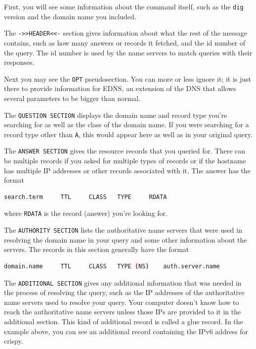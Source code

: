 \documentclass[11pt,a4paper]{article}
\begin{document}
First, you will see some information about the command itself, such as the \verb|dig| version and the domain name you included.

The \verb|->>HEADER<<-| section gives information about what the rest of the message contains, such as how many answers or records it fetched, and the id number of the query. 
The id number is used by the name servers to match queries with their responses. 

Next you may see the \verb|OPT| pseudosection. 
You can more or less ignore it; it is just there to provide information for EDNS, an extension of the DNS that allows several parameters to be bigger than normal. 

The \verb|QUESTION SECTION| displays the domain name and record type you're searching for as well as the class of the domain name. 
If you were searching for a record type other than \verb|A|, this would appear here as well as in your original query.

The \verb|ANSWER SECTION| gives the resource records that you queried for.
There can be multiple records if you asked for multiple types of records or if the hostname has multiple IP addresses or other records associated with it. 
The answer has the format 
\begin{lstlisting}[basicstyle=\ttfamily, backgroundcolor = \color{lightgray}, language = bash, xleftmargin = 0cm, framexleftmargin = 1em]
search.term 	TTL 	CLASS 	TYPE	 RDATA
\end{lstlisting}
where \verb|RDATA| is the record (answer) you're looking for.

The \verb|AUTHORITY SECTION| lists the authoritative name servers that were used in resolving the domain name in your query and some other information about the servers.
The records in this section generally have the format
\begin{lstlisting}[basicstyle=\ttfamily, backgroundcolor = \color{lightgray}, language = bash, xleftmargin = 0cm, framexleftmargin = 1em]
domain.name 	TTL 	CLASS 	TYPE (NS)	 auth.server.name
\end{lstlisting}

The \verb|ADDITIONAL SECTION| gives any additional information that was needed in the process of resolving the query, such as the IP addresses of the authoritative name servers used to resolve your query.
Your computer doesn't know how to reach the authoritative name servers unless those IPs are provided to it in the additional section. 
This kind of additional record is called a glue record.
In the example above, you can see an additional record containing the IPv6 address for crispy.
\end{document}
